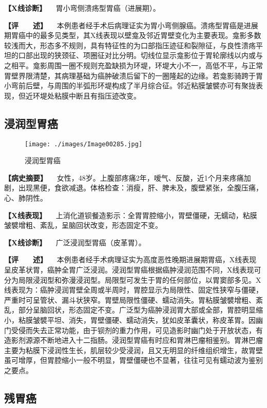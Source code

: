 \textbf{【X线诊断】} 　胃小弯侧溃疡型胃癌（进展期）。

\textbf{【评　　述】}
　本例患者经手术后病理证实为胃小弯侧腺癌。溃疡型胃癌是进展期胃癌中的最多见类型，其X线表现以壁龛及邻近胃壁变化为主要表现。龛影多数较浅而大，形态多不规则，具有特征性的为口部指压迹征和裂隙征，与良性溃疡平坦的口部出现的狭颈征、项圈征对比分明。切线位显示龛影位于胃轮廓线以内或与之相平。龛影周围一圈不规则充盈缺损为环堤，环堤大小不一，高低不平，与正常胃壁界限清楚，其病理基础为癌肿破溃后留下的一圈隆起的边缘。若龛影骑跨于胃小弯前后壁，与周围的半弧形环堤构成了半月综合征。邻近粘膜皱襞亦可有聚拢表现，但近环堤处粘膜中断且有指压迹改变。

\subsection{浸润型胃癌}

\begin{figure}[!htbp]
 \centering
 \texttt{[image: ./images/Image00285.jpg]}
 \captionsetup{justification=centering}
 \caption{浸润型胃癌}
 \label{fig5-3-23}
  \end{figure} 

\textbf{【病史摘要】}
　女性，48岁。上腹部疼痛2年，嗳气、反酸，近1个月来疼痛加剧，出现黑便，食欲减退。体格检查：消瘦，肝、脾未及，腹壁紧张，全腹压痛，心、肺阴性。

\textbf{【X线表现】}
　上消化道钡餐造影示：全胃胃腔缩小，胃壁僵硬，无蠕动，粘膜皱襞增粗、紊乱，呈脑回状改变，形态固定不变。

\textbf{【X线诊断】} 　广泛浸润型胃癌（皮革胃）。

\textbf{【评　　述】}
　本例患者经手术病理证实为高度恶性晚期进展期胃癌，X线表现呈皮革状胃，癌肿全胃广泛浸润。浸润型胃癌根据癌肿浸润范围不同，X线表现可分为局限浸润型和弥漫浸润型。局限型可发生于胃的任何部位，以胃窦部多见。X线表现为：癌肿浸润胃壁全周或半周时，胃腔显示为局限性、固定性狭窄与僵硬，严重时可呈管状、漏斗状狭窄。胃壁局限性僵硬、蠕动消失。胃粘膜皱襞增粗、紊乱，部分呈脑回状，形态固定不变。广泛型为癌肿浸润胃大部或全部，胃腔明显缩小，粘膜皱襞平坦、消失，胃壁僵硬、蠕动消失，犹如皮革囊状，称皮革胃。因幽门受侵而失去正常功能，由于钡剂的重力作用，可见造影时幽门处于开放状态，有造影剂源源不断地进入十二指肠。浸润型胃癌有时应和胃淋巴瘤相鉴别。胃淋巴瘤主要为粘膜下浸润性生长，肌层较少受浸润，且又无明显的纤维组织增生，故胃壁虽可增厚，但胃腔缩小一般不明显，胃壁僵硬也不显著，往往可见有蠕动波为鉴别之要点。

\subsection{残胃癌}

